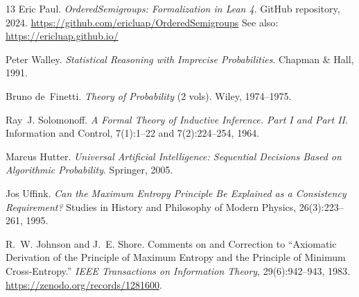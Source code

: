 \documentclass[11pt]{article}
\theoremstyle{definition}
\theoremstyle{remark}
\begin{document}
\begin{thebibliography}{13}
Eric Paul.
\textit{OrderedSemigroups: Formalization in Lean 4}.
GitHub repository, 2024. \url{https://github.com/ericluap/OrderedSemigroups}
See also: \url{https://ericluap.github.io/}

Peter Walley.
\textit{Statistical Reasoning with Imprecise Probabilities}.
Chapman \& Hall, 1991.

Bruno de~Finetti.
\textit{Theory of Probability} (2 vols).
Wiley, 1974--1975.

Ray~J. Solomonoff.
\textit{A Formal Theory of Inductive Inference. Part I and Part II}.
Information and Control, 7(1):1--22 and 7(2):224--254, 1964.

Marcus Hutter.
\textit{Universal Artificial Intelligence: Sequential Decisions Based on Algorithmic Probability}.
Springer, 2005.

Jos Uffink.
\textit{Can the Maximum Entropy Principle Be Explained as a Consistency Requirement?}
Studies in History and Philosophy of Modern Physics, 26(3):223--261, 1995.

R.~W. Johnson and J.~E. Shore.
Comments on and Correction to ``Axiomatic Derivation of the Principle of Maximum Entropy and the Principle of Minimum Cross-Entropy.''
\emph{IEEE Transactions on Information Theory}, 29(6):942--943, 1983.
\url{https://zenodo.org/records/1281600}.

\end{thebibliography}
\end{document}
